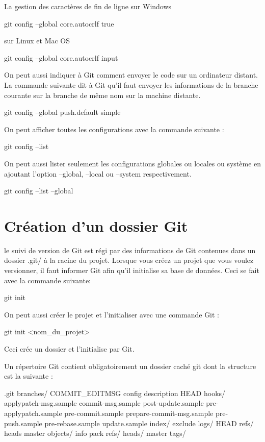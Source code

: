 \documentclass[11pt, a4paper]{book}
\begin{document}
La gestion des caractères de fin de ligne sur Windows
\begin{bash}
git config --global core.autocrlf true
\end{bash}
sur Linux et Mac OS
\begin{bash}
git config --global core.autocrlf input
\end{bash}
On peut aussi indiquer à Git comment envoyer le code sur un ordinateur distant. La commande suivante dit à Git qu'il faut envoyer les informations de la branche courante sur la branche de même nom sur la machine distante.
\begin{bash}
git config --global push.default simple
\end{bash}

On peut afficher toutes les configurations avec la commande suivante :
\begin{bash}
git config --list
\end{bash}
On peut aussi lister seulement les configurations globales ou locales ou système en ajoutant l'option --global, --local ou --system respectivement.
\begin{bash}
git config --list --global 
\end{bash}
\chapter{Création d'un dossier Git}
le suivi de version de Git est régi par des informations de Git contenues dans un dossier .git/ à la racine du projet. Lorsque vous créez un projet que vous voulez versionner, il faut informer Git afin qu'il initialise sa base de données. Ceci se fait avec la commande suivante:
\begin{bash}
git init
\end{bash}

On peut aussi créer le projet et l'initialiser avec une commande Git :
\begin{bash}
git init <nom_du_projet>
\end{bash}
Ceci crée un dossier et l'initialise par Git. 

Un répertoire Git contient obligatoirement un dossier caché git dont la structure est la suivante :

\begin{bash}
.git
    branches/
    COMMIT_EDITMSG
    config
    description
    HEAD
    hooks/
        applypatch-msg.sample
        commit-msg.sample
        post-update.sample
        pre-applypatch.sample
        pre-commit.sample
        prepare-commit-msg.sample
        pre-push.sample
        pre-rebase.sample
        update.sample
    index/
        exclude
    logs/
        HEAD
        refs/
            heads
                master
    objects/
        info
        pack
    refs/
        heads/
            master
        tags/
\end{bash}
\end{document}
